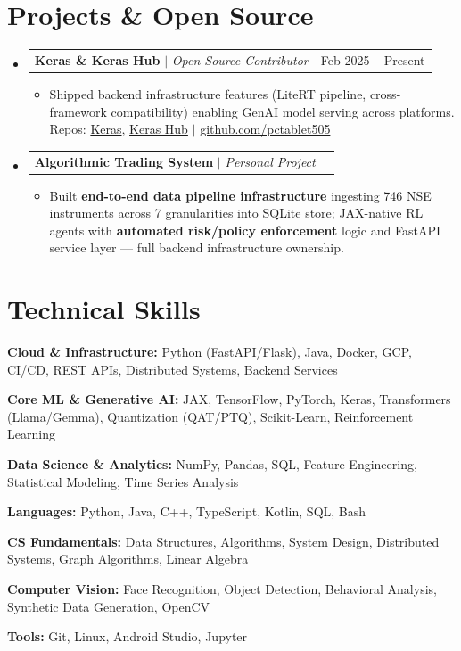 \documentclass[10pt, letterpaper]{article}
\makeatletter
\newcommand{\resumeItem}[1]{
  \item\small{
    {#1 \vspace{-2pt}}
  }
}
\newcommand{\resumeProjectHeading}[2]{
    \item
    \begin{tabular*}{0.98\textwidth}{l@{\extracolsep{\fill}}r}
      \small#1 & #2 \\
    \end{tabular*}\vspace{-7pt}
}
\newcommand{\resumeSubHeadingListStart}{\begin{itemize}[leftmargin=0.15in, label={}]}
\newcommand{\resumeSubHeadingListEnd}{\end{itemize}}
\newcommand{\resumeItemListStart}{\begin{itemize}}
\newcommand{\resumeItemListEnd}{\end{itemize}\vspace{-5pt}}
\makeatother
\begin{document}
\section{Projects \& Open Source}
  \resumeSubHeadingListStart
    \resumeProjectHeading
      {\textbf{Keras \& Keras Hub} $|$ \emph{Open Source Contributor}}{Feb 2025 -- Present}
      \resumeItemListStart
        \resumeItem{Shipped backend infrastructure features (LiteRT pipeline, cross-framework compatibility) enabling GenAI model serving across platforms. Repos: \href{https://github.com/keras-team/keras}{Keras}, \href{https://github.com/keras-team/keras-hub}{Keras Hub} $|$ \href{https://github.com/pctablet505}{github.com/pctablet505}}
      \resumeItemListEnd
    \resumeProjectHeading
      {\textbf{Algorithmic Trading System} $|$ \emph{Personal Project}}{}
      \resumeItemListStart
        \resumeItem{Built \textbf{end-to-end data pipeline infrastructure} ingesting 746 NSE instruments across 7 granularities into SQLite store; JAX-native RL agents with \textbf{automated risk/policy enforcement} logic and FastAPI service layer — full backend infrastructure ownership.}
      \resumeItemListEnd
  \resumeSubHeadingListEnd

\section{Technical Skills}
 \begin{itemize}[leftmargin=0.12in, label={}]
    \small{\item{\textbf{Cloud \& Infrastructure:} Python (FastAPI/Flask), Java, Docker, GCP, CI/CD, REST APIs, Distributed Systems, Backend Services}}
    \small{\item{\textbf{Core ML \& Generative AI:} JAX, TensorFlow, PyTorch, Keras, Transformers (Llama/Gemma), Quantization (QAT/PTQ), Scikit-Learn, Reinforcement Learning}}
    \small{\item{\textbf{Data Science \& Analytics:} NumPy, Pandas, SQL, Feature Engineering, Statistical Modeling, Time Series Analysis}}
    \small{\item{\textbf{Languages:} Python, Java, C++, TypeScript, Kotlin, SQL, Bash}}
    \small{\item{\textbf{CS Fundamentals:} Data Structures, Algorithms, System Design, Distributed Systems, Graph Algorithms, Linear Algebra}}
    \small{\item{\textbf{Computer Vision:} Face Recognition, Object Detection, Behavioral Analysis, Synthetic Data Generation, OpenCV}}
    \small{\item{\textbf{Tools:} Git, Linux, Android Studio, Jupyter}}
 \end{itemize}
\end{document}
